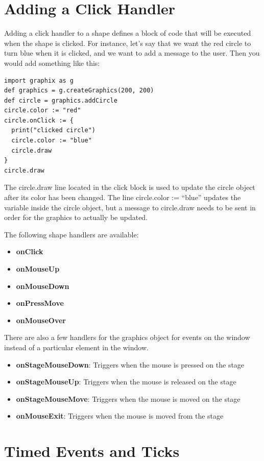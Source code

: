\documentclass{article}
\begin{document}
\section{Adding a Click Handler}
Adding a click handler to a shape defines a block of code that will be executed when the shape is clicked. For instance,
let's say that we want the red circle to turn blue when it is clicked, and we want to add a message to the user. 
Then you would add something like this:
\begin{lstlisting}
import graphix as g
def graphics = g.createGraphics(200, 200)
def circle = graphics.addCircle
circle.color := "red"
circle.onClick := { 
  print("clicked circle") 
  circle.color := "blue"
  circle.draw
}
circle.draw
\end{lstlisting}
The \color{blue} circle.draw \color{black} line located in the click block is used to update the circle object after its color
has been changed. The line \color{blue}circle.color := ``blue'' \color{black} updates the variable inside the circle object, but
a message to circle.draw needs to be sent in order for the graphics to actually be updated.

The following shape handlers are available:
\begin{itemize}
\item \textbf{onClick} 
\item \textbf{onMouseUp}
\item \textbf{onMouseDown}
\item \textbf{onPressMove}
\item \textbf{onMouseOver}
\end{itemize}

There are also a few handlers for the graphics object for events on the window instead of a
particular element in the window.
\begin{itemize}
\item \textbf{onStageMouseDown}: Triggers when the mouse is pressed on the stage
\item \textbf{onStageMouseUp}: Triggers when the mouse is released on the stage
\item \textbf{onStageMouseMove}: Triggers when the mouse is moved on the stage
\item \textbf{onMouseExit}: Triggers when the mouse is moved from the stage
\end{itemize}

\section{Timed Events and Ticks}
\end{document}
